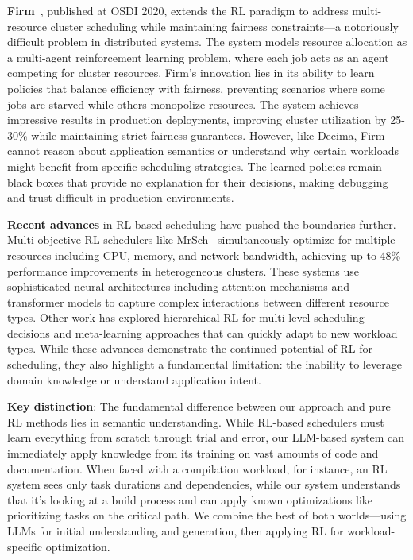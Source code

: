 \textbf{Firm}~\cite{qiu2020firm}, published at OSDI 2020, extends the RL paradigm to address multi-resource cluster scheduling while maintaining fairness constraints—a notoriously difficult problem in distributed systems. The system models resource allocation as a multi-agent reinforcement learning problem, where each job acts as an agent competing for cluster resources. Firm's innovation lies in its ability to learn policies that balance efficiency with fairness, preventing scenarios where some jobs are starved while others monopolize resources. The system achieves impressive results in production deployments, improving cluster utilization by 25-30\% while maintaining strict fairness guarantees. However, like Decima, Firm cannot reason about application semantics or understand why certain workloads might benefit from specific scheduling strategies. The learned policies remain black boxes that provide no explanation for their decisions, making debugging and trust difficult in production environments.

\textbf{Recent advances} in RL-based scheduling have pushed the boundaries further. Multi-objective RL schedulers like MrSch~\cite{zhang2024mrsch} simultaneously optimize for multiple resources including CPU, memory, and network bandwidth, achieving up to 48\% performance improvements in heterogeneous clusters. These systems use sophisticated neural architectures including attention mechanisms and transformer models to capture complex interactions between different resource types. Other work has explored hierarchical RL for multi-level scheduling decisions and meta-learning approaches that can quickly adapt to new workload types. While these advances demonstrate the continued potential of RL for scheduling, they also highlight a fundamental limitation: the inability to leverage domain knowledge or understand application intent.

\textbf{Key distinction}: The fundamental difference between our approach and pure RL methods lies in semantic understanding. While RL-based schedulers must learn everything from scratch through trial and error, our LLM-based system can immediately apply knowledge from its training on vast amounts of code and documentation. When faced with a compilation workload, for instance, an RL system sees only task durations and dependencies, while our system understands that it's looking at a build process and can apply known optimizations like prioritizing tasks on the critical path. We combine the best of both worlds—using LLMs for initial understanding and generation, then applying RL for workload-specific optimization.

